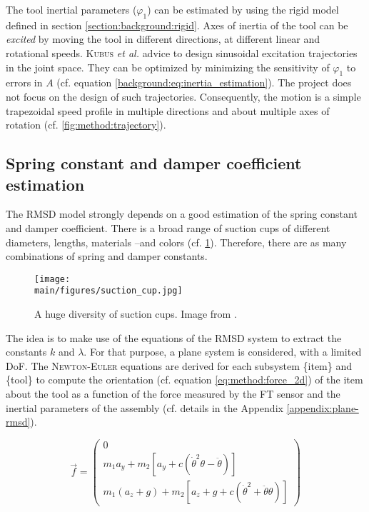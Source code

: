 \documentclass[/home/francois/latex/report/main.tex]{subfiles}
\begin{document}
The tool inertial parameters ($\varphi_1$) can be estimated by using the rigid model defined in section \ref{section:background:rigid}. Axes of inertia of the tool can be \textit{excited} by moving the tool in different directions, at different linear and rotational speeds. \textsc{Kubus} \textit{et al.} \cite{Kubus2008} advice to design sinusoidal excitation trajectories in the joint space. They can be optimized by minimizing the sensitivity of $\varphi_1$ to errors in $A$ (cf. equation \ref{background:eq:inertia_estimation}). The project does not focus on the design of such trajectories. Consequently, the motion is a simple trapezoidal speed profile in multiple directions and about multiple axes of rotation (cf. \ref{fig:method:trajectory}).

\subsection{Spring constant and damper coefficient estimation}

The \ac{RMSD} model strongly depends on a good estimation of the spring constant and damper coefficient. There is a broad range of suction cups of different diameters, lengths, materials –and colors (cf. \ref{fig:method:suction-cups}). Therefore, there are as many combinations of spring and damper constants.

\begin{figure}[H]
  \centering
  \texttt{[image: \\main/figures/suction\_cup.jpg]}
  \caption{A huge diversity of suction cups. Image from \cite{Piab2020}.}
  \label{fig:method:suction-cups}
\end{figure}

The idea is to make use of the equations of the \ac{RMSD} system to extract the constants $k$ and $\lambda$. For that purpose, a plane system is considered, with a limited \ac{DoF}. The \textsc{Newton-Euler} equations are derived for each subsystem \{item\} and \{tool\} to compute the orientation (cf. equation \ref{eq:method:force_2d}) of the item about the tool as a function of the force measured by the \ac{FT} sensor and the inertial parameters of the assembly (cf. details in the Appendix \ref{appendix:plane-rmsd}).

\begin{equation}
  \label{eq:method:force_2d}
  \overrightarrow{f}
  =
  \begin{pmatrix}
  0 \\
  m_1 a_y + m_2 [a_y + c (\dot{\theta}^2 \theta - \ddot{\theta})] \\
  m_1 (a_z + g) + m_2 [a_z + g + c (\dot{\theta}^2 + \ddot{\theta} \theta)]
  \end{pmatrix}
\end{equation}
\end{document}
